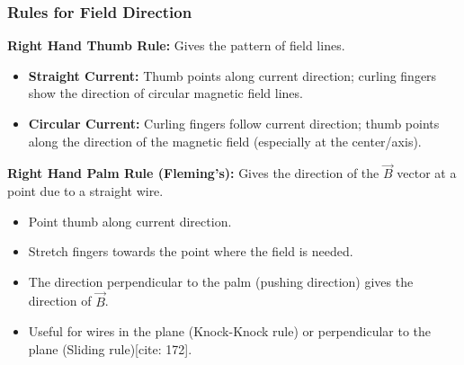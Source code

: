 \transfade[duration=0.5]

\begin{frame}[t]
    \frametitle{\textcolor{deepnavy}{\textbf{Rules for Field Direction}}}
    \renewcommand{\familydefault}{\rmdefault}
    \small

      \item<+-> \textbf{Right Hand Thumb Rule:} Gives the pattern of field lines.
        \begin{itemize}[<+->]
              \item \textbf{Straight Current:} Thumb points along current direction; curling fingers show the direction of circular magnetic field lines. %
              \item \textbf{Circular Current:} Curling fingers follow current direction; thumb points along the direction of the magnetic field (especially at the center/axis). %
        \end{itemize}

    \vspace{1em}

      \item<+-> \textbf{Right Hand Palm Rule (Fleming's):} Gives the direction of the $\vec{B}$ vector at a point due to a straight wire.
        \begin{itemize}[<+->]
            \item Point thumb along current direction.
            \item Stretch fingers towards the point where the field is needed.
            \item The direction perpendicular to the palm (pushing direction) gives the direction of $\vec{B}$.
              \item Useful for wires in the plane (Knock-Knock rule)   or perpendicular to the plane (Sliding rule)[cite: 172].
        \end{itemize}
\end{frame}


\transfade[duration=0.5]

